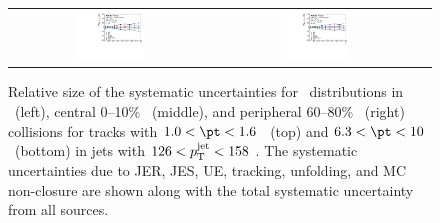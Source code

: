 \begin{figure}
{\begin{tabular}{ccc}
\includegraphics[width=0.36\textwidth]{figures/systematics/ChPS_dR_sys_PbPb_error_trk6_jet7_cent0} &
\includegraphics[width=0.36\textwidth]{figures/systematics/ChPS_dR_sys_PbPb_error_trk6_jet7_cent5} \\
\end{tabular}}
\caption{
Relative size of the systematic uncertainties for \Dptr\ distributions in \pp\ (left), central 0--10\% \pbpb\ (middle), and peripheral 60--80\% \pbpb\ (right) collisions for tracks with $1.0 < \pt < 1.6$ \GeV\ (top) and $6.3 < \pt < 10$ \GeV\ (bottom) in jets with $126 < \mbox{$p_{\mathrm{T}}^{\mathrm{jet}}$} < 158$ \GeV.
The systematic uncertainties due to JER, JES, UE, tracking, unfolding, and MC non-closure are shown along with the total systematic uncertainty from all sources.
}
\label{fig:Systematics_Dpt}
\end{figure}


